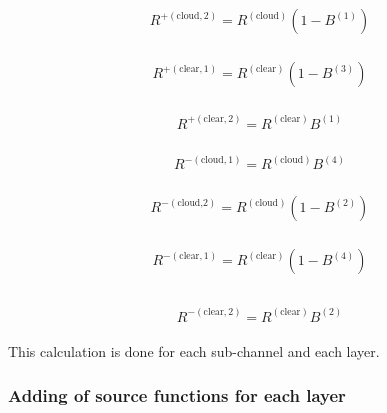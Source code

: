 \begin{eqnarray}
\begin{array}{l}
R^{+(\text {cloud}, 2)}=R^{(\text {cloud})}\left(1-B^{(1)}\right)
\end{array}
\end{eqnarray}

\begin{eqnarray}
\begin{array}{l}
R^{+(\text {clear}, 1)}=R^{(\text {clear})}\left(1-B^{(3)}\right)
\end{array}
\end{eqnarray}

\begin{eqnarray}
\begin{array}{l}
R^{+(\text {clear}, 2)}=R^{(\text {clear})} B^{(1)}
\end{array}
\end{eqnarray}

\begin{eqnarray}
\begin{array}{l}
R^{-(\text {cloud}, 1)}=R^{(\text {cloud})} B^{(4)}
\end{array}
\end{eqnarray}

\begin{eqnarray}
\begin{array}{l}
R^{-(\text {cloud,2})}=R^{(\text {cloud})}\left(1-B^{(2)}\right)
\end{array}
\end{eqnarray}

\begin{eqnarray}
\begin{array}{l}
R^{-(\text {clear}, 1)}=R^{(\text {clear})}\left(1-B^{(4)}\right) \\
\end{array}
\end{eqnarray}

\begin{eqnarray}
\begin{array}{l}
R^{-(\text {clear}, 2)}=R^{(\text {clear})} B^{(2)}
\end{array}
\end{eqnarray}

This calculation is done for each sub-channel and each layer.

\hypertarget{adding-of-source-functions-for-each-layer}{%
\subsubsection{Adding of source functions for each layer}\label{adding-of-source-functions-for-each-layer}}

